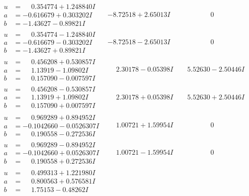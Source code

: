 \documentclass[1p]{elsarticle_modified}
\theoremstyle{definition}
\begin{document}
$$\begin{array}{c|c|c}
\begin{aligned}
u &= \phantom{-}0.354774 + 1.248840 I \\
a &= -0.616679 + 0.303202 I \\
b &= -1.43627 - 0.89821 I\end{aligned}
 & -8.72518 + 2.65013 I & \phantom{-0.000000 } 0 \\ \hline\begin{aligned}
u &= \phantom{-}0.354774 - 1.248840 I \\
a &= -0.616679 - 0.303202 I \\
b &= -1.43627 + 0.89821 I\end{aligned}
 & -8.72518 - 2.65013 I & \phantom{-0.000000 } 0 \\ \hline\begin{aligned}
u &= \phantom{-}0.456208 + 0.530857 I \\
a &= \phantom{-}1.13919 - 1.09802 I \\
b &= \phantom{-}0.157090 - 0.007597 I\end{aligned}
 & \phantom{-}2.30178 - 0.05398 I & \phantom{-}5.52630 - 2.50446 I \\ \hline\begin{aligned}
u &= \phantom{-}0.456208 - 0.530857 I \\
a &= \phantom{-}1.13919 + 1.09802 I \\
b &= \phantom{-}0.157090 + 0.007597 I\end{aligned}
 & \phantom{-}2.30178 + 0.05398 I & \phantom{-}5.52630 + 2.50446 I \\ \hline\begin{aligned}
u &= \phantom{-}0.969289 + 0.894952 I \\
a &= -0.1042660 - 0.0526307 I \\
b &= \phantom{-}0.190558 - 0.272536 I\end{aligned}
 & \phantom{-}1.00721 + 1.59954 I & \phantom{-0.000000 } 0 \\ \hline\begin{aligned}
u &= \phantom{-}0.969289 - 0.894952 I \\
a &= -0.1042660 + 0.0526307 I \\
b &= \phantom{-}0.190558 + 0.272536 I\end{aligned}
 & \phantom{-}1.00721 - 1.59954 I & \phantom{-0.000000 } 0 \\ \hline\begin{aligned}
u &= \phantom{-}0.499313 + 1.221980 I \\
a &= \phantom{-}0.800563 + 0.576581 I \\
b &= \phantom{-}1.75153 - 0.48262 I\end{aligned}

\end{array}$$
\end{document}
